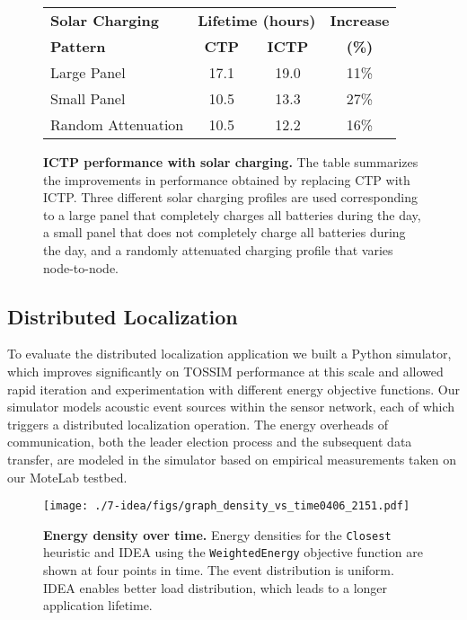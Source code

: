 \begin{figure}[t]
\begin{small}
\begin{center}
\begin{tabular}{|l|ccc|}
\hline
\textbf{Solar Charging} & \multicolumn{2}{c}{\textbf{Lifetime (hours)}} & \textbf{Increase} \\
\textbf{Pattern} & \textbf{CTP} & \textbf{ICTP} & \textbf{(\%)} \\ \hline
Large Panel & 17.1 & 19.0 & 11\% \\
Small Panel & 10.5 & 13.3 & 27\% \\
Random Attenuation & 10.5 & 12.2 & 16\% \\ \hline
\end{tabular}
\end{center}
\end{small}
\caption{\small{\textbf{ICTP performance with solar charging.}
The table summarizes the improvements in performance obtained by replacing
CTP with ICTP. Three different solar charging profiles are used corresponding
to a large panel that completely charges all batteries during the day, a
small panel that does not completely charge all batteries during the day, and a randomly
attenuated charging profile that varies node-to-node.}}
\label{table-ictpvoptimaltossim}
\end{figure}


\subsection{Distributed Localization}

To evaluate the distributed localization application we built a Python
simulator, which improves significantly on TOSSIM performance at this scale
and allowed rapid iteration and experimentation with different energy
objective functions. Our simulator models acoustic event sources within the
sensor network, each of which triggers a distributed localization operation.
The energy overheads of communication, both the leader election process and
the subsequent data transfer, are modeled in the simulator based on empirical
measurements taken on our MoteLab testbed.

\begin{figure*}[t]
\begin{center}
\texttt{[image: ./7-idea/figs/graph\_density\_vs\_time0406\_2151.pdf]}
\end{center}
\caption{\small{\textbf{Energy density over time.}
Energy densities for the \texttt{Closest} heuristic and IDEA using the
\texttt{WeightedEnergy} objective function are shown at four points in time. The
event distribution is uniform. IDEA enables better load distribution, which
leads to a longer application lifetime.}}
\label{fig-localizationdensityvtime}
\end{figure*}

